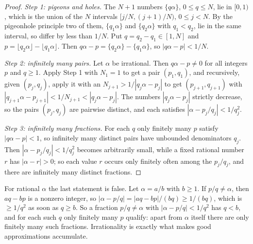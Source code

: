 \begin{proof}
\emph{Step 1: pigeons and holes.} The $N + 1$ numbers $\{q\alpha\}$, $0 \leq q \leq N$, lie in $[0, 1)$, which is the union of the $N$ intervals $[j/N, (j + 1)/N)$, $0 \leq j < N$. By the pigeonhole
principle two of them, $\{q_1\alpha\}$ and $\{q_2\alpha\}$ with $q_1 < q_2$, lie in the same interval, so differ by less than $1/N$. Put $q = q_2 - q_1 \in [1, N]$ and
$p = \lfloor q_2\alpha \rfloor - \lfloor q_1\alpha \rfloor$. Then $q\alpha - p = \{q_2\alpha\} - \{q_1\alpha\}$, so $|q\alpha - p| < 1/N$.

\emph{Step 2: infinitely many pairs.} Let $\alpha$ be irrational. Then $q\alpha - p \neq 0$ for all integers $p$ and $q \geq 1$. Apply Step 1 with $N_1 = 1$ to get a pair $(p_1, q_1)$, and
recursively, given $(p_j, q_j)$, apply it with an $N_{j+1} > 1/|q_j\alpha - p_j|$ to get $(p_{j+1}, q_{j+1})$ with $|q_{j+1}\alpha - p_{j+1}| < 1/N_{j+1} < |q_j\alpha - p_j|$. The numbers
$|q_j\alpha - p_j|$ strictly decrease, so the pairs $(p_j, q_j)$ are pairwise distinct, and each satisfies $|\alpha - p_j/q_j| < 1/q_j^2$.

\emph{Step 3: infinitely many fractions.} For each $q$ only finitely many $p$ satisfy $|q\alpha - p| < 1$, so infinitely many distinct pairs have unbounded denominators $q_j$. Then
$|\alpha - p_j/q_j| < 1/q_j^2$ becomes arbitrarily small, while a fixed rational number $r$ has $|\alpha - r| > 0$; so each value $r$ occurs only finitely often among the $p_j/q_j$, and there are
infinitely many distinct fractions.
\end{proof}

\begin{counterexample}\label{combinatorics:counterexample-dirichlet-rational}
For rational $\alpha$ the last statement is false. Let $\alpha = a/b$ with $b \geq 1$. If $p/q \neq \alpha$, then $aq - bp$ is a nonzero integer, so
$|\alpha - p/q| = |aq - bp|/(bq) \geq 1/(bq)$, which is $\geq 1/q^2$ as soon as $q \geq b$. So a fraction $p/q \neq \alpha$ with $|\alpha - p/q| < 1/q^2$ has $q < b$, and for each such $q$ only
finitely many $p$ qualify: apart from $\alpha$ itself there are only finitely many such fractions. Irrationality is exactly what makes good approximations accumulate.
\end{counterexample}

